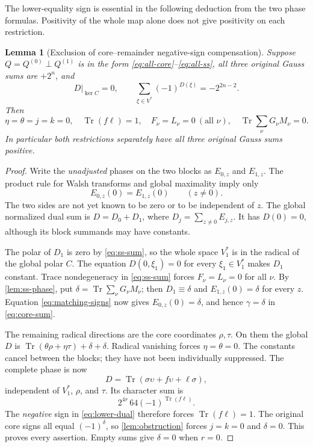 \documentclass[11pt,a4paper]{article}
\newtheorem{lemma}[theorem]{Lemma}
\theoremstyle{definition}
\theoremstyle{remark}
\numberwithin{equation}{section}
\newcommand{\Tr}{\operatorname{Tr}}
\begin{document}
The lower-equality sign is essential in the following deduction from
the two phase formulas. Positivity of the whole map alone does not
give positivity on each restriction.

\begin{lemma}[Exclusion of core--remainder negative-sign compensation]\label{lem:no-comp}
Suppose \(Q=Q^{(0)}\perp Q^{(1)}\) is in the form
\eqref{eq:all-core}--\eqref{eq:all-ss}, all three original Gauss sums
are \(+2^n\), and
\begin{equation}\label{eq:lower-dual}
 D|_{\ker C}=0,\qquad
 \sum_{\xi\in V^*}(-1)^{D(\xi)}=-2^{2n-2}.
\end{equation}
Then
\[
 \eta=\theta=j=k=0,\quad \Tr(f\ell)=1,\quad
 F_\nu=L_\nu=0\ (\text{all }\nu),\quad
 \Tr\sum_\nu G_\nu M_\nu=0.
\]
In particular both restrictions separately have all three original
Gauss sums positive.
\end{lemma}
\begin{proof}
Write the \emph{unadjusted} phases on the two blocks as \(E_{0,z}\)
and \(E_{1,z}\). The product rule for Walsh transforms and global
maximality imply only
\begin{equation}\label{eq:matching-signs}
 E_{0,z}(0)=E_{1,z}(0)\qquad(z\ne0).
\end{equation}
The two sides are not yet known to be zero or to be independent of \(z\).
The global normalized dual sum is
\(D=D_0+D_1\), where \(D_j=\sum_{z\ne0}E_{j,z}\).
It has \(D(0)=0\), although its block summands may have constants.

The polar of \(D_1\) is zero by \eqref{eq:ss-sum}, so the whole
space \(V_1^*\) is in the radical of the global polar \(C\).
The equation \(D(0,\xi_1)=0\) for every \(\xi_1\in V_1^*\) makes
\(D_1\) constant. Trace nondegeneracy in \eqref{eq:ss-sum} forces
\(F_\nu=L_\nu=0\) for all \(\nu\).
By \cref{lem:ss-phase}, put
\(\delta=\Tr\sum_\nu G_\nu M_\nu\); then
\(D_1\equiv\delta\) and \(E_{1,z}(0)=\delta\) for every \(z\).
Equation \eqref{eq:matching-signs} now gives
\(E_{0,z}(0)=\delta\), and hence \(\gamma=\delta\) in
\eqref{eq:core-sum}.

The remaining radical directions are the core coordinates
\(\rho,\tau\). On them the global \(D\) is
\(\Tr(\theta\rho+\eta\tau)+\delta+\delta\).
Radical vanishing forces \(\eta=\theta=0\).
The constants cancel between the blocks; they have not been
individually suppressed. The complete phase is now
\[
 D=\Tr(\sigma\upsilon+f\upsilon+\ell\sigma),
\]
independent of \(V_1^*\), \(\rho\), and \(\tau\).
Its character sum is
\[
 2^{4r}\,64(-1)^{\Tr(f\ell)}.
\]
The \emph{negative} sign in \eqref{eq:lower-dual} therefore forces
\(\Tr(f\ell)=1\).
The original core signs all equal \((-1)^\delta\), so
\cref{lem:obstruction} forces \(j=k=0\) and \(\delta=0\).
This proves every assertion. Empty sums give \(\delta=0\) when \(r=0\).
\end{proof}
\end{document}
